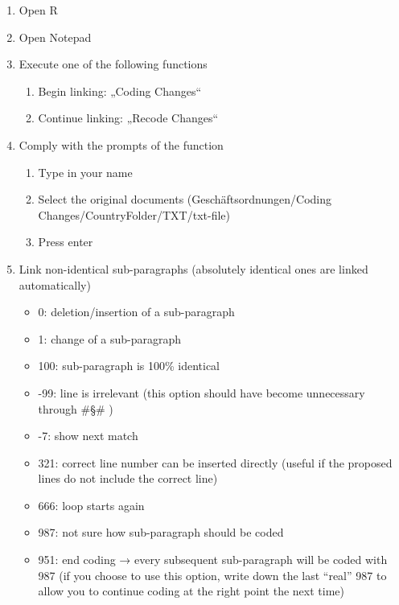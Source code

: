 \documentclass[10pt,]{article}
\providecommand{\tightlist}{%
  \setlength{\itemsep}{0pt}\setlength{\parskip}{0pt}}
\begin{document}
\begin{enumerate}
\def\labelenumi{\arabic{enumi})}
\tightlist
\item
  Open R
\item
  Open Notepad
\item
  Execute one of the following functions

  \begin{enumerate}
  \def\labelenumii{\alph{enumii}.}
  \tightlist
  \item
    Begin linking: „Coding Changes``
  \item
    Continue linking: „Recode Changes``
  \end{enumerate}
\item
  Comply with the prompts of the function

  \begin{enumerate}
  \def\labelenumii{\alph{enumii}.}
  \tightlist
  \item
    Type in your name
  \item
    Select the original documents (Geschäftsordnungen/Coding
    Changes/CountryFolder/TXT/txt-file)
  \item
    Press enter
  \end{enumerate}
\item
  Link non-identical sub-paragraphs (absolutely identical ones are
  linked automatically)

  \begin{itemize}
  \tightlist
  \item
    0: deletion/insertion of a sub-paragraph
  \item
    1: change of a sub-paragraph
  \item
    100: sub-paragraph is 100\% identical
  \item
    -99: line is irrelevant (this option should have become unnecessary
    through \#§\# )
  \item
    -7: show next match
  \item
    321: correct line number can be inserted directly (useful if the
    proposed lines do not include the correct line)
  \item
    666: loop starts again
  \item
    987: not sure how sub-paragraph should be coded
  \item
    951: end coding → every subsequent sub-paragraph will be coded with
    987 (if you choose to use this option, write down the last ``real''
    987 to allow you to continue coding at the right point the next
    time)
  \end{itemize}
\end{enumerate}
\end{document}
